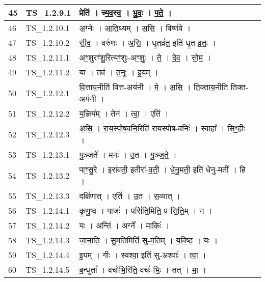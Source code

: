 \documentclass[17pt]{extarticle}
\begin{document}
\begin{longtable}{||p{0.4in}||p{0.9in}||p{4.0in}||p{0.9in}||}
        \hline
            45 & TS\_1.2.9.1 & प्रेति॑   ।   च्य॒व॒स्व॒   ।   भु॒वः॒   ।   प॒ते॒   ।    &      \\
        \hline
            46 & TS\_1.2.10.1 & अ॒ग्नेः   ।   आ॒ति॒थ्यम्   ।   अ॒सि॒   ।   विष्ण॑वे   ।    &      \\
        \hline
            47 & TS\_1.2.10.2 & सी॒द॒   ।   वरु॑णः   ।   अ॒सि॒   ।   धृ॒तव्र॑त॒ इति॑ धृ॒त{-}व्र॒तः॒   ।    &      \\
        \hline
            48 & TS\_1.2.11.1 & अꣳ॒॒शुरꣳ॑शु॒रित्यꣳ॒॒शुः{-}अꣳ॒॒शुः॒   ।   ते॒   ।   दे॒व॒   ।   सो॒म॒   ।    &      \\
        \hline
            49 & TS\_1.2.11.2 & या   ।   तव॑   ।   त॒नूः   ।   इ॒यम्   ।    &      \\
        \hline
            50 & TS\_1.2.12.1 & वि॒त्ताय॒नीति॑ वित्त{-}अय॑नी   ।   मे॒   ।   अ॒सि॒   ।   ति॒क्ताय॒नीति॑ तिक्त{-}अय॑नी   ।    &      \\
        \hline
            51 & TS\_1.2.12.2 & य॒ज्ञिय᳚म्   ।   तेन॑   ।   त्वा॒   ।   एति॑   ।    &      \\
        \hline
            52 & TS\_1.2.12.3 & अ॒सि॒   ।   रा॒य॒स्पो॒ष॒वनि॒रिति॑ रायस्पोष{-}वनिः॑   ।   स्वाहा᳚   ।   सिꣳ॒॒हीः   ।    &      \\
        \hline
            53 & TS\_1.2.13.1 & यु॒ञ्जते᳚   ।   मनः॑   ।   उ॒त   ।   यु॒ञ्ज॒ते॒   ।    &      \\
        \hline
            54 & TS\_1.2.13.2 & पाꣳ॒॒सु॒रे   ।   इरा॑वती॒ इतीरा᳚{-}व॒ती॒   ।   धे॒नु॒मती॒ इति॑ धेनु{-}मती᳚   ।   हि   ।    &      \\
        \hline
            55 & TS\_1.2.13.3 & दक्षि॑णात्   ।   एति॑   ।   उ॒त   ।   स॒व्यात्   ।    &      \\
        \hline
            56 & TS\_1.2.14.1 & कृ॒णु॒ष्व   ।   पाजः॑   ।   प्रसि॑ति॒मिति॒ प्र{-}सि॒ति॒म्   ।   न   ।    &      \\
        \hline
            57 & TS\_1.2.14.2 & यः   ।   अन्ति॑   ।   अग्ने᳚   ।   माकिः॑   ।    &      \\
        \hline
            58 & TS\_1.2.14.3 & जा॒ना॒ति॒   ।   सु॒म॒तिमिति॑ सु{-}म॒तिम्   ।   य॒वि॒ष्ठ॒   ।   यः   ।    &      \\
        \hline
            59 & TS\_1.2.14.4 & इ॒यम्   ।   गीः   ।   स्वश्वा॒ इति॑ सु{-}अश्वाः᳚   ।   त्वा॒   ।    &      \\
        \hline
            60 & TS\_1.2.14.5 & ब॒न्धुता᳚   ।   वचो॑भि॒रिति॒ वचः॑{-}भिः॒   ।   तत्   ।   मा॒   ।    &      \\

\end{longtable}
\end{document}
